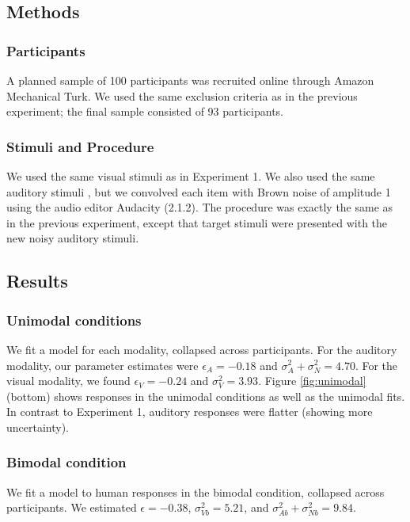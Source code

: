 \documentclass[10pt,letterpaper]{article}
\begin{document}
\subsection{Methods}

\subsubsection{Participants}

A planned sample of 100 participants was recruited online through Amazon Mechanical Turk. We used the same exclusion criteria as in the previous experiment; the final sample consisted of 93 participants.

\subsubsection{Stimuli and Procedure}

We used the same visual stimuli as in Experiment 1. We also used the same auditory stimuli , but we convolved each item with Brown noise of amplitude 1 using the audio editor Audacity (2.1.2). The procedure was exactly the same as in the previous experiment, except that target stimuli were presented with the new noisy auditory stimuli.

\subsection{Results}

\subsubsection{Unimodal conditions}

We fit a model for each modality, collapsed across participants. For the auditory modality, our parameter estimates were $\epsilon_A=-0.18$ and $\sigma^2_A+\sigma^2_N=4.70$. For the visual modality, we found $\epsilon_V=-0.24$ and $\sigma^2_V=3.93$.  Figure \ref{fig:unimodal} (bottom) shows responses in the unimodal conditions as well as the unimodal fits. In contrast to Experiment 1, auditory responses were flatter (showing more uncertainty).

\subsubsection{Bimodal condition}

We fit a model to human responses in the bimodal condition, collapsed across participants. We estimated $\epsilon=-0.38$, $\sigma^2_{Vb}=5.21$, and  $\sigma^2_{Ab}+\sigma^2_{Nb}=9.84$.
\end{document}
